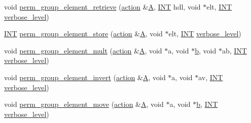 \begin{DoxyCompactItemize}
\item 
void \mbox{\hyperlink{interface__perm__group_8_c_a4c8b92d581a75f0483bb37760e752430}{perm\+\_\+group\+\_\+element\+\_\+retrieve}} (\mbox{\hyperlink{classaction}{action}} \&\mbox{\hyperlink{simeon_8_c_a97833f04c3a9c008df5521a2fc291bb4}{A}}, \mbox{\hyperlink{galois_8h_a09fddde158a3a20bd2dcadb609de11dc}{I\+NT}} hdl, void $\ast$elt, \mbox{\hyperlink{galois_8h_a09fddde158a3a20bd2dcadb609de11dc}{I\+NT}} \mbox{\hyperlink{simeon_8_c_a818073fbcc2f439e7c56952f67386122}{verbose\+\_\+level}})
\item 
\mbox{\hyperlink{galois_8h_a09fddde158a3a20bd2dcadb609de11dc}{I\+NT}} \mbox{\hyperlink{interface__perm__group_8_c_a952bca01116a86ba8c2886b67d414784}{perm\+\_\+group\+\_\+element\+\_\+store}} (\mbox{\hyperlink{classaction}{action}} \&\mbox{\hyperlink{simeon_8_c_a97833f04c3a9c008df5521a2fc291bb4}{A}}, void $\ast$elt, \mbox{\hyperlink{galois_8h_a09fddde158a3a20bd2dcadb609de11dc}{I\+NT}} \mbox{\hyperlink{simeon_8_c_a818073fbcc2f439e7c56952f67386122}{verbose\+\_\+level}})
\item 
void \mbox{\hyperlink{interface__perm__group_8_c_ab15b0c49289683127056f726011bc2ed}{perm\+\_\+group\+\_\+element\+\_\+mult}} (\mbox{\hyperlink{classaction}{action}} \&\mbox{\hyperlink{simeon_8_c_a97833f04c3a9c008df5521a2fc291bb4}{A}}, void $\ast$a, void $\ast$\mbox{\hyperlink{alphabet2_8_c_a148e3876077787926724625411d6e7a9}{b}}, void $\ast$ab, \mbox{\hyperlink{galois_8h_a09fddde158a3a20bd2dcadb609de11dc}{I\+NT}} \mbox{\hyperlink{simeon_8_c_a818073fbcc2f439e7c56952f67386122}{verbose\+\_\+level}})
\item 
void \mbox{\hyperlink{interface__perm__group_8_c_a96f61c7fbc6a187176ee94d71af31a6a}{perm\+\_\+group\+\_\+element\+\_\+invert}} (\mbox{\hyperlink{classaction}{action}} \&\mbox{\hyperlink{simeon_8_c_a97833f04c3a9c008df5521a2fc291bb4}{A}}, void $\ast$a, void $\ast$av, \mbox{\hyperlink{galois_8h_a09fddde158a3a20bd2dcadb609de11dc}{I\+NT}} \mbox{\hyperlink{simeon_8_c_a818073fbcc2f439e7c56952f67386122}{verbose\+\_\+level}})
\item 
void \mbox{\hyperlink{interface__perm__group_8_c_a73ea7f24ce56d2a5932d834169ea6c8d}{perm\+\_\+group\+\_\+element\+\_\+move}} (\mbox{\hyperlink{classaction}{action}} \&\mbox{\hyperlink{simeon_8_c_a97833f04c3a9c008df5521a2fc291bb4}{A}}, void $\ast$a, void $\ast$\mbox{\hyperlink{alphabet2_8_c_a148e3876077787926724625411d6e7a9}{b}}, \mbox{\hyperlink{galois_8h_a09fddde158a3a20bd2dcadb609de11dc}{I\+NT}} \mbox{\hyperlink{simeon_8_c_a818073fbcc2f439e7c56952f67386122}{verbose\+\_\+level}})

\end{DoxyCompactItemize}
